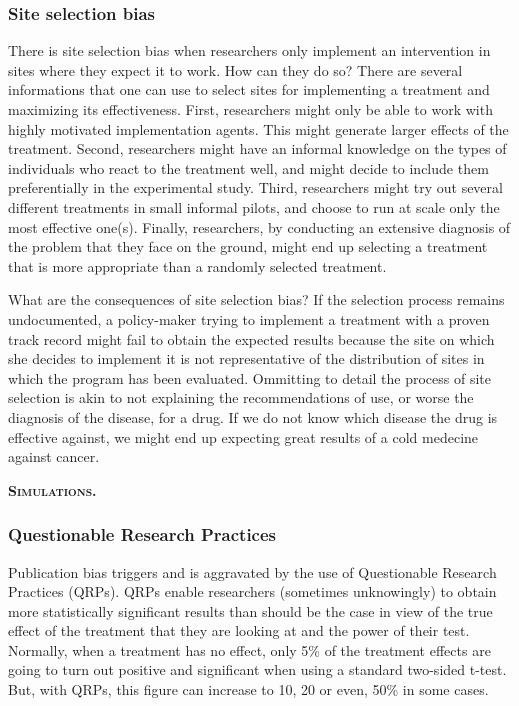 \documentclass[]{book}
\theoremstyle{definition}
\theoremstyle{definition}
\theoremstyle{definition}
\theoremstyle{remark}
\begin{document}
\hypertarget{site-selection-bias-1}{%
\subsubsection{Site selection bias}\label{site-selection-bias-1}}

There is site selection bias when researchers only implement an intervention in sites where they expect it to work.
How can they do so?
There are several informations that one can use to select sites for implementing a treatment and maximizing its effectiveness.
First, researchers might only be able to work with highly motivated implementation agents.
This might generate larger effects of the treatment.
Second, researchers might have an informal knowledge on the types of individuals who react to the treatment well, and might decide to include them preferentially in the experimental study.
Third, researchers might try out several different treatments in small informal pilots, and choose to run at scale only the most effective one(s).
Finally, researchers, by conducting an extensive diagnosis of the problem that they face on the ground, might end up selecting a treatment that is more appropriate than a randomly selected treatment.

What are the consequences of site selection bias?
If the selection process remains undocumented, a policy-maker trying to implement a treatment with a proven track record might fail to obtain the expected results because the site on which she decides to implement it is not representative of the distribution of sites in which the program has been evaluated.
Ommitting to detail the process of site selection is akin to not explaining the recommendations of use, or worse the diagnosis of the disease, for a drug.
If we do not know which disease the drug is effective against, we might end up expecting great results of a cold medecine against cancer.

\textbf{\textsc{Simulations.}}

\hypertarget{questionable-research-practices}{%
\subsubsection{Questionable Research Practices}\label{questionable-research-practices}}

Publication bias triggers and is aggravated by the use of Questionable Research Practices (QRPs).
QRPs enable researchers (sometimes unknowingly) to obtain more statistically significant results than should be the case in view of the true effect of the treatment that they are looking at and the power of their test.
Normally, when a treatment has no effect, only 5\% of the treatment effects are going to turn out positive and significant when using a standard two-sided t-test.
But, with QRPs, this figure can increase to 10, 20 or even, 50\% in some cases.
\end{document}
